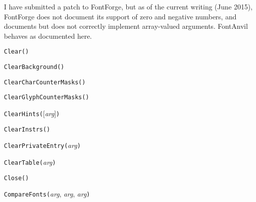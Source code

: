 I \FFdiff have submitted a patch to FontForge, but as of the current writing
(June 2015), FontForge does not document its support of zero and
negative numbers,
and documents but does not correctly implement array-valued arguments. 
FontAnvil behaves as documented here.



\texttt{Clear()}



\texttt{ClearBackground(}\texttt{)}



\texttt{ClearCharCounterMasks(}\texttt{)}



\texttt{ClearGlyphCounterMasks(}\texttt{)}



\texttt{ClearHints(}[\textit{arg}]\texttt{)}



\texttt{ClearInstrs(}\texttt{)}



\texttt{ClearPrivateEntry(}\textit{arg}\texttt{)}



\texttt{ClearTable(}\textit{arg}\texttt{)}



\texttt{Close(}\texttt{)}



\texttt{CompareFonts(}\textit{arg}, \textit{arg}, \textit{arg}\texttt{)}



